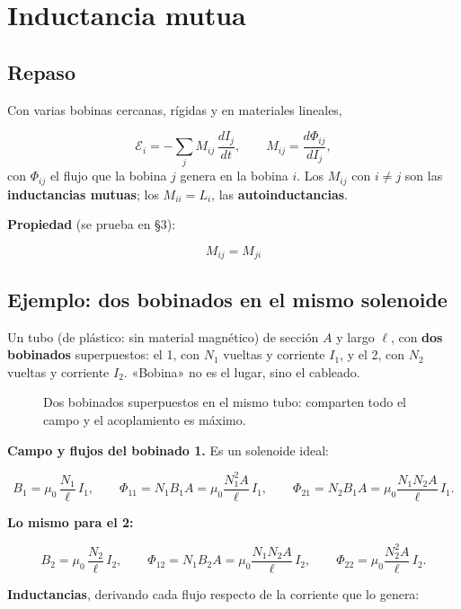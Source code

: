 \documentclass[12pt,a4paper]{article}
\begin{document}
\section{Inductancia mutua}

\subsection{Repaso}

Con varias bobinas cercanas, rígidas y en materiales lineales,

\[
\mathcal{E}_i = -\sum_j M_{ij}\,\frac{dI_j}{dt},
\qquad M_{ij} = \frac{d\Phi_{ij}}{dI_j},
\]
con $\Phi_{ij}$ el flujo que la bobina $j$ genera en la bobina $i$. Los
$M_{ij}$ con $i\neq j$ son las \textbf{inductancias mutuas}; los $M_{ii} = L_i$, las
\textbf{autoinductancias}.

\textbf{Propiedad} (se prueba en §3):

\begin{keybox}
\[
\boxed{\ M_{ij} = M_{ji}\ }
\]
\end{keybox}

\subsection{Ejemplo: dos bobinados en el mismo solenoide}

Un tubo (de plástico: sin material magnético) de sección $A$ y largo $\ell$,
con \textbf{dos bobinados} superpuestos: el 1, con $N_1$ vueltas y corriente $I_1$,
y el 2, con $N_2$ vueltas y corriente $I_2$. «Bobina» no es el lugar, sino el
cableado.

\begin{figure}[H]
  \centering
  
  \caption{Dos bobinados superpuestos en el mismo tubo: comparten todo el campo y el acoplamiento es máximo.}
\end{figure}

\textbf{Campo y flujos del bobinado 1.} Es un solenoide ideal:

\[
B_1 = \mu_0\,\frac{N_1}{\ell}\,I_1,
\qquad
\Phi_{11} = N_1 B_1 A = \mu_0\frac{N_1^2 A}{\ell}\,I_1,
\qquad
\Phi_{21} = N_2 B_1 A = \mu_0\frac{N_1 N_2 A}{\ell}\,I_1 .
\]

\textbf{Lo mismo para el 2:}

\[
B_2 = \mu_0\,\frac{N_2}{\ell}\,I_2,
\qquad
\Phi_{12} = N_1 B_2 A = \mu_0\frac{N_1 N_2 A}{\ell}\,I_2,
\qquad
\Phi_{22} = \mu_0\frac{N_2^2 A}{\ell}\,I_2 .
\]

\textbf{Inductancias}, derivando cada flujo respecto de la corriente que lo genera:
\end{document}
